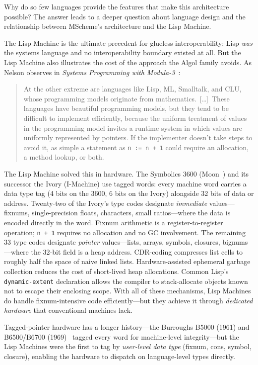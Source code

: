 \documentclass[11pt]{article}
\begin{document}
Why do so few languages provide the features that make this
architecture possible?  The answer leads to a deeper question about
language design and the relationship between MScheme's architecture
and the Lisp Machine.

The Lisp Machine is the ultimate precedent for glueless
interoperability: Lisp \emph{was} the systems language and no
interoperability boundary existed at all.  But the Lisp Machine also
illustrates the cost of the approach the Algol family avoids.  As
Nelson observes in \emph{Systems Programming with
Modula-3}~\cite{nelson1991}:

\begin{quote}
At the other extreme are languages like Lisp, ML, Smalltalk, and CLU,
whose programming models originate from mathematics.\ [\ldots]\ These
languages have beautiful programming models, but they tend to be
difficult to implement efficiently, because the uniform treatment of
values in the programming model invites a runtime system in which
values are uniformly represented by pointers.  If the implementer
doesn't take steps to avoid it, as simple a statement as
\texttt{n := n + 1} could require an allocation, a method lookup, or
both.
\end{quote}

The Lisp Machine solved this in hardware.  The Symbolics 3600
(Moon~\cite{moon1985}) and its successor the Ivory (I-Machine) use
tagged words: every machine word carries a data type tag (4 bits on
the 3600, 6 bits on the Ivory) alongside 32 bits of data or address.
Twenty-two of the Ivory's type codes designate \emph{immediate}
values---fixnums, single-precision floats, characters, small
ratios---where the data is encoded directly in the word.  Fixnum
arithmetic is a register-to-register operation; \texttt{n + 1}
requires no allocation and no GC involvement.  The remaining 33 type
codes designate \emph{pointer} values---lists, arrays, symbols,
closures, bignums---where the 32-bit field is a heap address.
CDR-coding compresses list cells to roughly half the space of naive
linked lists.  Hardware-assisted ephemeral garbage collection reduces
the cost of short-lived heap allocations.  Common Lisp's
\texttt{dynamic-extent} declaration allows the compiler to
stack-allocate objects known not to escape their enclosing scope.  With
all of these mechanisms, Lisp Machines do handle fixnum-intensive code
efficiently---but they achieve it through \emph{dedicated hardware}
that conventional machines lack.

Tagged-pointer hardware has a longer history---the Burroughs B5000
(1961) and B6500/B6700 (1969)~\cite{organick1973} tagged every word
for machine-level integrity---but the Lisp Machines were the first to
tag by \emph{user-level data type} (fixnum, cons, symbol, closure),
enabling the hardware to dispatch on language-level types directly.
\end{document}
